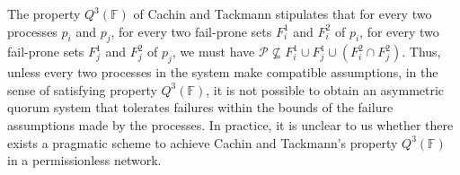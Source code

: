 \documentclass[11pt,letterpaper]{article}
\begin{document}

The property $Q^3(\mathbb{F})$ of Cachin and Tackmann stipulates that for every two processes $p_i$ and $p_j$, for every two fail-prone sets $F_i^1$ and $F_i^2$ of $p_i$, for every two fail-prone sets $F_j^1$ and $F_j^2$ of $p_j$, we must have $\mathcal{P}\not\subseteq F_i^1\cup F_j^1\cup \left(F_i^2\cap F_j^2\right)$. Thus, unless every two processes in the system make compatible assumptions, in the sense of satisfying property $Q^3(\mathbb{F})$, it is not possible to obtain an asymmetric quorum system that tolerates failures within the bounds of the failure assumptions made by the processes. In practice, it is unclear to us whether there exists a pragmatic scheme to achieve Cachin and Tackmann's property $Q^3(\mathbb{F})$ in a permissionless network.
\printbibliography





\end{document}
